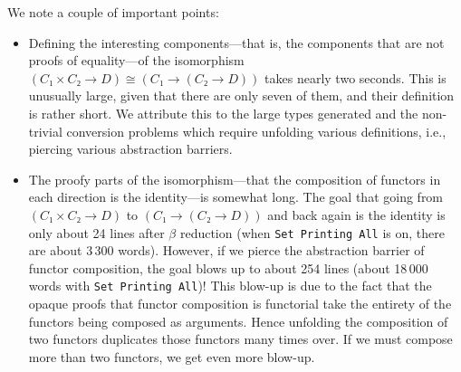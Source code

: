 We note a couple of important points:
\begin{itemize}
\item
  Defining the interesting components---that is, the components that are not proofs of equality---of the isomorphism $(C₁ × C₂ → D) ≅ (C₁ → (C₂ → D))$ takes nearly two seconds.
  This is unusually large, given that there are only seven of them, and their definition is rather short.
  We attribute this to the large types generated and the non-trivial conversion problems which require unfolding various definitions, i.e., piercing various abstraction barriers.
\item
  The proofy parts of the isomorphism---that the composition of functors in each direction is the identity---is somewhat long.
  The goal that going from $(C₁ × C₂ → D)$ to $(C₁ → (C₂ → D))$ and back again is the identity is only about 24 lines after $\beta$ reduction (when \texttt{Set Printing All} is on, there are about 3\,300 words).
  However, if we pierce the abstraction barrier of functor composition, the goal blows up to about 254 lines (about 18\,000 words with \texttt{Set Printing All})!
  This blow-up is due to the fact that the opaque proofs that functor composition is functorial take the entirety of the functors being composed as arguments.
  Hence unfolding the composition of two functors duplicates those functors many times over.
  If we must compose more than two functors, we get even more blow-up.
\end{itemize}



